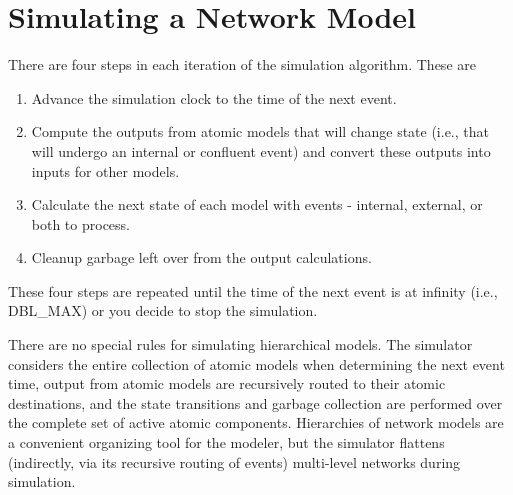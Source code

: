 \section{Simulating a Network Model}
There are four steps in each iteration of the simulation algorithm. These are
\begin{enumerate}
\item Advance the simulation clock to the time of the next event.
\item Compute the outputs from atomic models that will change state (i.e., that will undergo an internal or confluent event) and convert these outputs into inputs for other models.
\item Calculate the next state of each model with events - internal, external, or both to process.
\item Cleanup garbage left over from the output calculations.
\end{enumerate}
These four steps are repeated until the time of the next event is at infinity (i.e., DBL\_MAX) or you decide to stop the simulation. 

There are no special rules for simulating hierarchical models. The simulator considers the entire collection of atomic models when determining the next event time, output from atomic models are recursively routed to their atomic destinations, and the state transitions and garbage collection are performed over the complete set of active atomic components. Hierarchies of network models are a convenient organizing tool for the modeler, but the simulator flattens (indirectly, via its recursive routing of events) multi-level networks during simulation.

